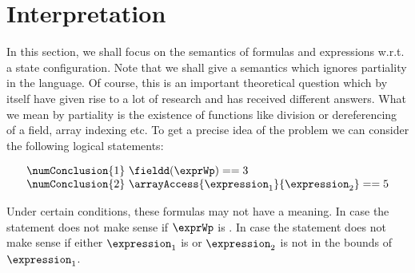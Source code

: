 
\newtheorem{interpExpr}{Definition}[section]
\newtheorem{interpTypeExpr}[interpExpr]{Definition} 
\newtheorem{interpPred}[interpExpr]{Definition}


\section{Interpretation}\label{interpret}

In this section, we shall focus on the semantics of formulas and expressions w.r.t. a state configuration.
Note that we shall give a semantics which ignores partiality in the language. Of course, this is an 
important theoretical question which by itself have given rise to a lot of research and has received different answers.
What we mean by partiality is the existence of functions like division or dereferencing of a field, array indexing etc. 
To get a precise idea of the problem we can consider the following logical statements: 

$$
\begin{array}{l} 
\numConclusion{1} \  \fieldd(\exprWp ) == 3\\
\numConclusion{2} \ \arrayAccess{\expression_1} {\expression_2} == 5
\end{array}
$$   

Under certain conditions, these formulas may not have a meaning. In case 
  the statement does not make sense if
$\exprWp$ is \Mynull. In case    the statement does not make sense if 
either $\expression_1 $ is \Mynull{} or $\expression_2$  is not in the bounds of $\expression_1 $.


